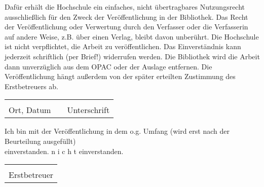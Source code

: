 \bigskip
\bigskip

Daf\"ur erh\"alt die Hochschule ein einfaches, nicht \"ubertragbares Nutzungsrecht ausschlie{\ss}lich f\"ur den Zweck der Ver\"offentlichung in der Bibliothek. Das Recht der Ver\"offentlichung oder Verwertung durch den Verfasser oder die Verfasserin auf andere Weise, z.B. \"uber einen Verlag, bleibt davon unber\"uhrt. Die Hochschule ist nicht verpflichtet, die Arbeit zu ver\"offentlichen. Das Einverst\"andnis kann jederzeit schriftlich (per Brief!) widerrufen werden. Die Bibliothek wird die Arbeit dann unverz\"uglich aus dem OPAC oder der Auslage entfernen. Die Ver\"offentlichung h\"angt au{\ss}erdem von der sp\"ater erteilten Zustimmung des Erstbetreuers ab.

\bigskip
\bigskip

\begin{tabular}{lp{1cm}l}
  \hspace{6cm} && \hspace{6cm} \\ \cline{1-1} \cline{3-3}
  Ort, Datum && Unterschrift
\end{tabular}

\bigskip
\bigskip

Ich bin mit der Ver\"offentlichung in dem o.g. Umfang (wird erst nach der Beurteilung ausgef\"ullt)\\
\Square \hspace{0.2cm} einverstanden. \hspace{1cm} \Square \hspace{0.2cm} n i c h t einverstanden.

\bigskip
\bigskip

\begin{tabular}{l}
  \hspace{6cm} \\ \cline{1-1}
  Erstbetreuer
\end{tabular}
